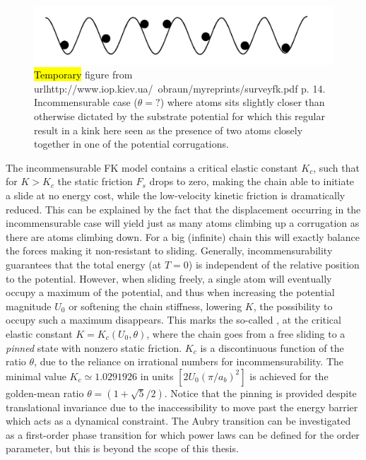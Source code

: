 
\begin{figure}[H]
  \centering
  \includegraphics[width=0.5\linewidth]{figures/theory/incommensurable_example.png}
  \caption{\hl{Temporary} figure from
  url{http://www.iop.kiev.ua/~obraun/myreprints/surveyfk.pdf} p. 14.
  Incommensurable case ($\theta = ?$) where atoms sits slightly closer than
  otherwise dictated by the substrate potential for which this regular result in
  a kink here seen as the presence of two atoms closely together in one of the
  potential corrugations.}
  \label{fig:incommensurable_example}
\end{figure}


The incommensurable \acrshort{FK} model contains a critical elastic constant $K_c$, such that for $K > K_c$ the static friction $F_s$ drops to zero, making the chain able to initiate a slide at no energy cost, while the low-velocity kinetic friction is dramatically reduced. This can be explained by the
fact that the displacement occurring in the incommensurable case will yield just
as many atoms climbing up a corrugation as there are atoms climbing down. For a big (infinite) chain this will exactly balance the forces making it
non-resistant to sliding. Generally, incommensurability guarantees that the
total energy (at $T=0$) is independent of the relative position to the
potential. However, when sliding freely, a single atom will eventually occupy a
maximum of the potential, and thus when increasing the potential magnitude $U_0$ or
softening the chain stiffness, lowering $K$, the possibility to occupy such a
maximum disappears. This marks the so-called ,
at the critical elastic constant $K = K_c(U_0, \theta)$, where the chain goes
from a free sliding to a \textit{pinned} state with nonzero static friction.
$K_c$ is a discontinuous function of the ratio $\theta$, due to the reliance on
irrational numbers for incommensurability. The minimal
value $K_c \simeq 1.0291926 $ in units $[2 U_0 (\pi / a_b)^2]$ is achieved for
the golden-mean ratio $\theta = (1+\sqrt{5}/2)$. Notice that the pinning is
provided despite translational invariance due to the inaccessibility to move
past the energy barrier which acts as a dynamical constraint. The Aubry transition can be investigated as a first-order phase transition for which power laws can be defined for the order parameter, but this is beyond the scope of this thesis.


